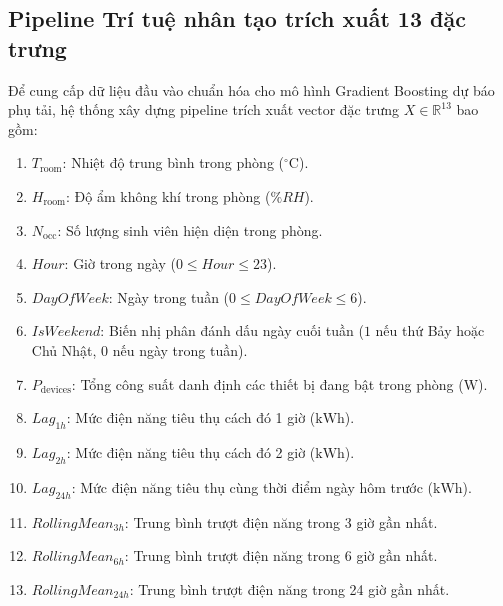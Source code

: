 \subsection{Pipeline Trí tuệ nhân tạo trích xuất 13 đặc trưng}
Để cung cấp dữ liệu đầu vào chuẩn hóa cho mô hình Gradient Boosting dự báo phụ tải, hệ thống xây dựng pipeline trích xuất vector đặc trưng $X \in \mathbb{R}^{13}$ bao gồm:
\begin{enumerate}
    \item $T_{\text{room}}$: Nhiệt độ trung bình trong phòng ($^\circ\text{C}$).
    \item $H_{\text{room}}$: Độ ẩm không khí trong phòng ($\%RH$).
    \item $N_{\text{occ}}$: Số lượng sinh viên hiện diện trong phòng.
    \item $Hour$: Giờ trong ngày ($0 \le Hour \le 23$).
    \item $DayOfWeek$: Ngày trong tuần ($0 \le DayOfWeek \le 6$).
    \item $IsWeekend$: Biến nhị phân đánh dấu ngày cuối tuần ($1$ nếu thứ Bảy hoặc Chủ Nhật, $0$ nếu ngày trong tuần).
    \item $P_{\text{devices}}$: Tổng công suất danh định các thiết bị đang bật trong phòng ($\text{W}$).
    \item $Lag_{1h}$: Mức điện năng tiêu thụ cách đó 1 giờ ($\text{kWh}$).
    \item $Lag_{2h}$: Mức điện năng tiêu thụ cách đó 2 giờ ($\text{kWh}$).
    \item $Lag_{24h}$: Mức điện năng tiêu thụ cùng thời điểm ngày hôm trước ($\text{kWh}$).
    \item $RollingMean_{3h}$: Trung bình trượt điện năng trong 3 giờ gần nhất.
    \item $RollingMean_{6h}$: Trung bình trượt điện năng trong 6 giờ gần nhất.
    \item $RollingMean_{24h}$: Trung bình trượt điện năng trong 24 giờ gần nhất.
\end{enumerate}
\newpage

